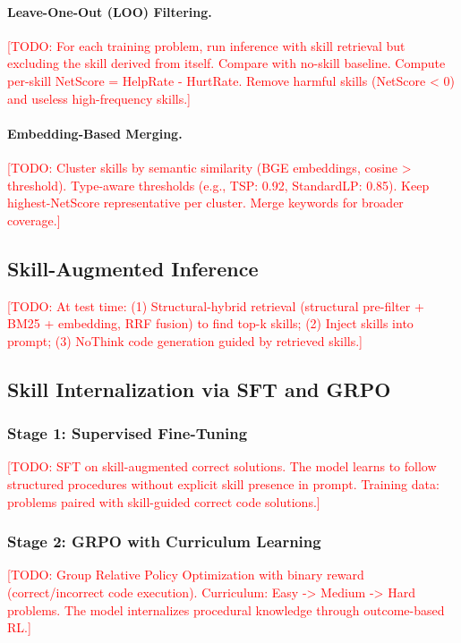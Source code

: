 \documentclass[11pt]{article}
\newcommand{\todo}[1]{\textcolor{red}{[TODO: #1]}}
\begin{document}
\paragraph{Leave-One-Out (LOO) Filtering.}
\todo{For each training problem, run inference with skill retrieval but excluding the skill derived from itself. Compare with no-skill baseline. Compute per-skill NetScore = HelpRate - HurtRate. Remove harmful skills (NetScore < 0) and useless high-frequency skills.}

\paragraph{Embedding-Based Merging.}
\todo{Cluster skills by semantic similarity (BGE embeddings, cosine > threshold). Type-aware thresholds (e.g., TSP: 0.92, StandardLP: 0.85). Keep highest-NetScore representative per cluster. Merge keywords for broader coverage.}

\subsection{Skill-Augmented Inference}
\label{sec:inference}

\todo{At test time: (1) Structural-hybrid retrieval (structural pre-filter + BM25 + embedding, RRF fusion) to find top-k skills; (2) Inject skills into prompt; (3) NoThink code generation guided by retrieved skills.}

\subsection{Skill Internalization via SFT and GRPO}
\label{sec:internalization}

\subsubsection{Stage 1: Supervised Fine-Tuning}
\todo{SFT on skill-augmented correct solutions. The model learns to follow structured procedures without explicit skill presence in prompt. Training data: problems paired with skill-guided correct code solutions.}

\subsubsection{Stage 2: GRPO with Curriculum Learning}
\todo{Group Relative Policy Optimization with binary reward (correct/incorrect code execution). Curriculum: Easy -> Medium -> Hard problems. The model internalizes procedural knowledge through outcome-based RL.}
\end{document}
